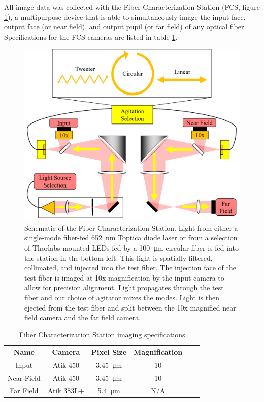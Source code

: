 \documentclass[twocolumn]{emulateapj}
\begin{document}
All image data was collected with the Fiber Characterization Station (FCS, figure \ref{fig:fcs}), a multipurpose device that is able to simultaneously image the input face, output face (or near field), and output pupil (or far field) of any optical fiber. Specifications for the FCS cameras are listed in table \ref{table:cameras}.

\begin{figure}
\centering
	\includegraphics[width=\columnwidth]{images/fcs_schematic.png}
	\caption{Schematic of the Fiber Characterization Station. Light from either a single-mode fiber-fed \SI{652}{\nano\meter} Toptica diode laser or from a selection of Thorlabs mounted LEDs fed by a \SI{100}{\micro\meter} circular fiber is fed into the station in the bottom left. This light is spatially filtered, collimated, and injected into the test fiber. The injection face of the test fiber is imaged at 10x magnification by the input camera to allow for precision alignment. Light propagates through the test fiber and our choice of agitator mixes the modes. Light is then ejected from the test fiber and split between the 10x magnified near field camera and the far field camera.}
\label{fig:fcs}
\end{figure}

\begin{table}
\centering
\caption{Fiber Characterization Station imaging specifications}
	\begin{tabular}{cccccc}
	\hline
	Name & Camera & Pixel Size & Magnification \\
	\hline \hline
	Input & Atik 450 & \SI{3.45}{\micro\meter} & 10 \\
	\hline
	Near Field & Atik 450 & \SI{3.45}{\micro\meter} & 10 \\
	\hline
	Far Field & Atik 383L+ & \SI{5.4}{\micro\meter} & N/A \\
	\hline	
	\end{tabular}
\label{table:cameras}
\end{table}
\end{document}

